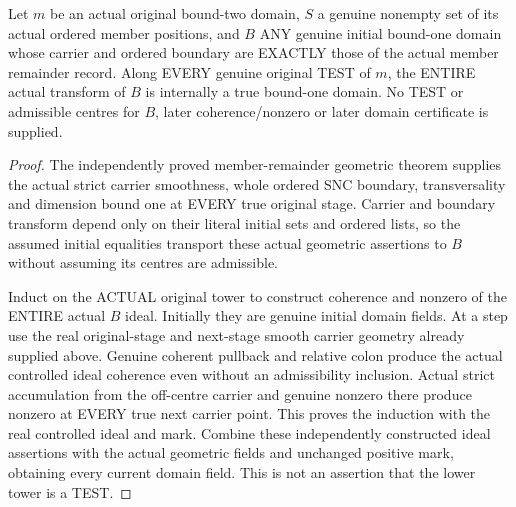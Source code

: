 \begin{lemma}
\label{hir:original-member-same-geometry-untested-curve-domains}
\leanok
Let $m$ be an actual original bound-two domain, $S$ a genuine nonempty
set of its actual ordered member positions, and $B$ ANY genuine initial
bound-one domain whose carrier and ordered boundary are EXACTLY those
of the actual member remainder record. Along EVERY genuine original
TEST of $m$, the ENTIRE actual transform of $B$ is internally a true
bound-one domain. No TEST or admissible centres for $B$, later
coherence/nonzero or later domain certificate is supplied.
\end{lemma}
\begin{proof}
The independently proved member-remainder geometric theorem supplies
the actual strict carrier smoothness, whole ordered SNC boundary,
transversality and dimension bound one at EVERY true original stage.
Carrier and boundary transform depend only on their literal initial
sets and ordered lists, so the assumed initial equalities transport
these actual geometric assertions to $B$ without assuming its centres
are admissible.

Induct on the ACTUAL original tower to construct coherence and nonzero
of the ENTIRE actual $B$ ideal. Initially they are genuine initial
domain fields. At a step use the real original-stage and next-stage
smooth carrier geometry already supplied above. Genuine coherent
pullback and relative colon produce the actual controlled ideal
coherence even without an admissibility inclusion. Actual strict
accumulation from the off-centre carrier and genuine nonzero there
produce nonzero at EVERY true next carrier point. This proves the
induction with the real controlled ideal and mark. Combine these
independently constructed ideal assertions with the actual geometric
fields and unchanged positive mark, obtaining every current domain
field. This is not an assertion that the lower tower is a TEST.
\end{proof}

